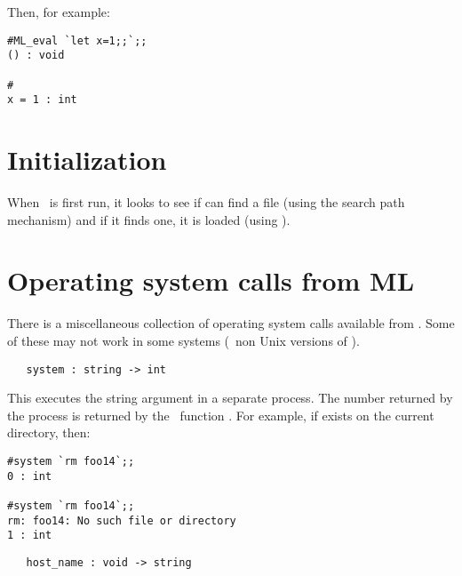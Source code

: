 \noindent Then, for example:

\begin{session}\begin{verbatim}
#ML_eval `let x=1;;`;;
() : void

#
x = 1 : int
\end{verbatim}\end{session}


\section{Initialization}\label{hol-init}


When \HOL\ is first run, it looks to see if can find a file 
(using the search path mechanism) and if it finds one, it is loaded (using
).

\section{Operating system calls from ML}

There is a miscellaneous collection of operating system calls
available from \ML. Some of these may not work in some systems
(\eg\ non Unix versions of \HOL{}).

\begin{boxed}
\begin{verbatim}
   system : string -> int
\end{verbatim}\end{boxed}

This executes the string argument in a separate process. The number returned by the
process is returned by the \ML\ function . For example, if
 exists on the current directory, then:

\setcounter{sessioncount}{1}
\begin{session}\begin{verbatim}
#system `rm foo14`;;
0 : int

#system `rm foo14`;;
rm: foo14: No such file or directory
1 : int
\end{verbatim}\end{session}
\vfill
\newpage

\begin{boxed}
\begin{verbatim}
   host_name : void -> string
\end{verbatim}\end{boxed}

